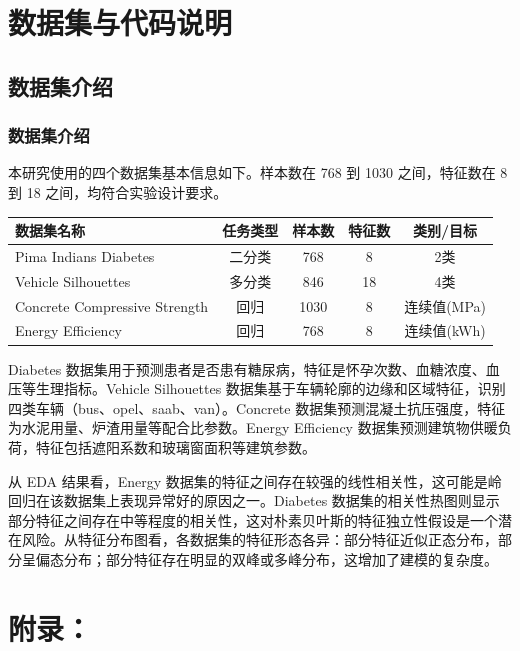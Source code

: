 \documentclass[UTF8,a4paper,12pt,fontset=fandol]{ctexart}
\begin{document}
\begin{tcolorbox}[mybox,
  title={\zihao{-3}\bfseries 实验内容}]
\par

\section{数据集与代码说明}
\subsection{数据集介绍}
\subsubsection{数据集介绍}

本研究使用的四个数据集基本信息如下。样本数在 768 到 1030 之间，特征数在 8 到 18 之间，均符合实验设计要求。

\vspace{0.3cm}
{\centering
{}
\begin{tabular}{lcccc}
\toprule
数据集名称 & 任务类型 & 样本数 & 特征数 & 类别/目标 \\
\midrule
Pima Indians Diabetes & 二分类 & 768 & 8 & 2类 \\
Vehicle Silhouettes & 多分类 & 846 & 18 & 4类 \\
Concrete Compressive Strength & 回归 & 1030 & 8 & 连续值(MPa) \\
Energy Efficiency & 回归 & 768 & 8 & 连续值(kWh) \\
\bottomrule
\end{tabular}\par}
\vspace{0.3cm}

Diabetes 数据集用于预测患者是否患有糖尿病，特征是怀孕次数、血糖浓度、血压等生理指标。Vehicle Silhouettes 数据集基于车辆轮廓的边缘和区域特征，识别四类车辆（bus、opel、saab、van）。Concrete 数据集预测混凝土抗压强度，特征为水泥用量、炉渣用量等配合比参数。Energy Efficiency 数据集预测建筑物供暖负荷，特征包括遮阳系数和玻璃窗面积等建筑参数。

从 EDA 结果看，Energy 数据集的特征之间存在较强的线性相关性，这可能是岭回归在该数据集上表现异常好的原因之一。Diabetes 数据集的相关性热图则显示部分特征之间存在中等程度的相关性，这对朴素贝叶斯的特征独立性假设是一个潜在风险。从特征分布图看，各数据集的特征形态各异：部分特征近似正态分布，部分呈偏态分布；部分特征存在明显的双峰或多峰分布，这增加了建模的复杂度。

\section{附录：}


\end{tcolorbox}
\end{document}
